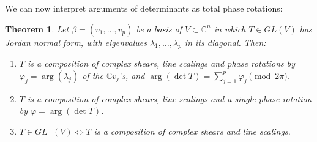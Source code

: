 \documentclass{birkjour}
\newtheorem{theorem}{Theorem}[section]
\theoremstyle{definition}
\def\C			{\mathds{C}}
\begin{document}
We can now interpret arguments of determinants as total phase rotations:

\begin{theorem}\label{pr:decomposition}
	Let $\beta = (v_1,\ldots,v_p)$ be a basis of $V \subset \C^n$ in which $T \in GL(V)$ has Jordan normal form, with eigenvalues $\lambda_1,\ldots,\lambda_p$ in its diagonal. 
	Then:
	\begin{enumerate}[label = (\roman*)]
		\item $T$ is a composition of complex shears, line scalings and phase rotations by $\varphi_j = \arg(\lambda_j)$ of the $\C v_j$'s,
		and $\arg(\det T) = \sum_{j=1}^p \varphi_j \pmod{2\pi}$. \label{it:T phases}
		
		\item $T$ is a composition of complex shears, line scalings and a single phase rotation by $\varphi = \arg(\det T)$. \label{it:T single phase}
		
		\item $T \in GL^+(V) \Leftrightarrow T$ is a composition of complex shears and line scalings. \label{it:GL+}
	\end{enumerate}
\end{theorem}
\end{document}
